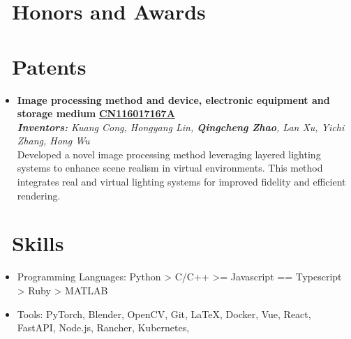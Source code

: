 \documentclass{resume}
\begin{document}
\section{\faTrophy\ Honors and Awards}

\vspace{-0.5em}

\section{\faGavel\ Patents}

\begin{itemize}
  \item \textbf{Image processing method and device, electronic equipment and storage medium} \hfill \textbf{\href{https://worldwide.espacenet.com/publicationDetails/biblio?CC=CN&NR=116017167A&KC=A&FT=D}{CN116017167A}}\\
        \textit{\small \textbf{Inventors:} Kuang Cong, Hongyang Lin, \textbf{Qingcheng Zhao}, Lan Xu, Yichi Zhang, Hong Wu} \\
        Developed a novel image processing method leveraging layered lighting systems to enhance scene realism in virtual environments. This method integrates real and virtual lighting systems for improved fidelity and efficient rendering.
\end{itemize}

\section{\faCogs\ Skills}
\begin{itemize}[parsep=0.5ex]
  \item Programming Languages: Python > C/C++ >= Javascript == Typescript > Ruby > MATLAB
  \item Tools: PyTorch, Blender, OpenCV, Git, \LaTeX, Docker, Vue, React, FastAPI, Node.js, Rancher, Kubernetes,
\end{itemize}


% 
\end{document}
